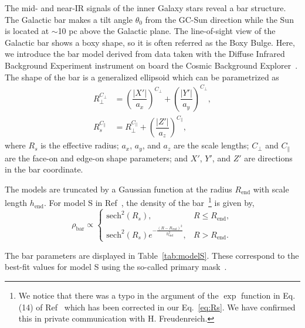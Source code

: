 \documentclass[doublespace,nopageskip]{VTthesis} %
\begin{document}
The mid- and near-IR signals of the inner Galaxy stars reveal a bar structure. The Galactic bar makes a tilt angle $\theta_0$ from the GC-Sun direction while the Sun is located at $\sim$10 pc above the Galactic plane. The line-of-sight view of the Galactic bar shows a boxy shape, so it is often referred as the Boxy Bulge. Here, we introduce the bar model derived from data taken with the Diffuse Infrared Background Experiment instrument on board the Cosmic Background Explorer~\cite{1998ApJ...492..495F}. The shape of the bar is a generalized ellipsoid which can be parametrized as
\begin{align}\label{eq:Rs}
  R_{\perp}^{C_{\perp}} &= \left(\dfrac{|X'|}{a_x}\right)^{C_{\perp}} + \left(\dfrac{|Y'|}{a_y}\right)^{C_{\perp}},\\
  R_s^{C_{\parallel}} &= R_{\perp}^{C_{\parallel}} + \left(\dfrac{|Z'|}{a_z}\right)^{C_{\parallel}},
\end{align}
where $R_s$ is the effective radius; $a_x$, $a_y$, and $a_z$ are the scale lengths; $C_\perp$ and $C_\parallel$ are the face-on and edge-on shape parameters; and $X'$, $Y'$, and $Z'$
are directions in the bar
coordinate. 

The models are truncated by a Gaussian function at the
radius $R_{\text{end}}$ with scale length $h_{\text{end}}$. For model S in Ref~\cite{1998ApJ...492..495F}, the density of the bar~\footnote{We notice that there was a typo in the argument of the $\exp$ function in Eq.(14) of Ref~\cite{1998ApJ...492..495F} which has been corrected in our Eq.~\ref{eq:Rs}. We have confirmed this in private communication with H. Freudenreich.} is given by,
\begin{equation}\label{eq:rhobar}
  \rho_{\text{bar}}\propto \begin{cases}
    \text{sech}^2(R_s), & R \leq R_{\text{end}},\\
    \text{sech}^2(R_s)e^{-\frac{(R-R_{\text{end}})^2}{h_{\text{end}}^2}}, &   R > R_{\text{end}}.
  \end{cases}
\end{equation}

The bar parameters 
are displayed in Table~\ref{tab:modelS}. These correspond to the best-fit values for model S using the so-called primary mask~\cite{1998ApJ...492..495F}. 
\end{document}
